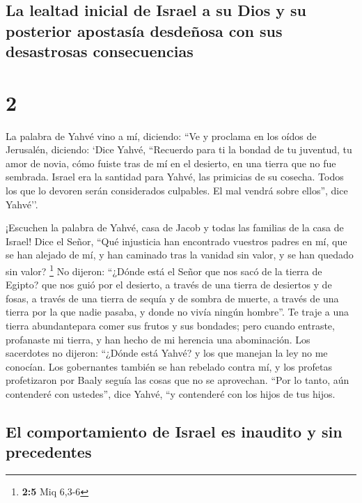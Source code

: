 \begin{paracol}{2}
{\subsection{La lealtad inicial de Israel a su Dios y su posterior
apostasía desdeñosa con sus desastrosas
consecuencias}\label{la-lealtad-inicial-de-israel-a-su-dios-y-su-posterior-apostasuxeda-desdeuxf1osa-con-sus-desastrosas-consecuencias}}

\hypertarget{section-2}{%
\section{2}\label{section-2}}

 La palabra de Yahvé vino a mí, diciendo: 
``Ve y proclama en los oídos de Jerusalén, diciendo: `Dice Yahvé,
``Recuerdo para ti la bondad de tu juventud, tu amor de novia, cómo
fuiste tras de mí en el desierto, en una tierra que no fue sembrada.
 Israel era la santidad para Yahvé, las primicias de su
cosecha. Todos los que lo devoren serán considerados culpables. El mal
vendrá sobre ellos'', dice Yahvé''.

 ¡Escuchen la palabra de Yahvé, casa de Jacob y todas las
familias de la casa de Israel!  Dice el Señor, ``Qué
injusticia han encontrado vuestros padres en mí, que se han alejado de
mí, y han caminado tras la vanidad sin valor, y se han quedado sin
valor? \footnote{\textbf{2:5} Miq 6,3-6}  No dijeron:
``¿Dónde está el Señor que nos sacó de la tierra de Egipto? que nos guió
por el desierto, a través de una tierra de desiertos y de fosas, a
través de una tierra de sequía y de sombra de muerte, a través de una
tierra por la que nadie pasaba, y donde no vivía ningún hombre''.
 Te traje a una tierra abundantepara comer sus frutos y
sus bondades; pero cuando entraste, profanaste mi tierra, y han hecho de
mi herencia una abominación.  Los sacerdotes no dijeron:
``¿Dónde está Yahvé? y los que manejan la ley no me conocían. Los
gobernantes también se han rebelado contra mí, y los profetas
profetizaron por Baaly seguía las cosas que no se aprovechan.
 ``Por lo tanto, aún contenderé con ustedes'', dice Yahvé,
``y contenderé con los hijos de tus hijos.

\hypertarget{el-comportamiento-de-israel-es-inaudito-y-sin-precedentes}{%
\subsection{El comportamiento de Israel es inaudito y sin
precedentes}\label{el-comportamiento-de-israel-es-inaudito-y-sin-precedentes}}


\end{paracol}
